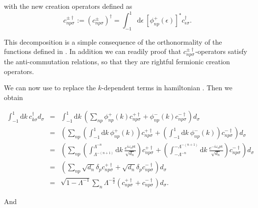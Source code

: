 with the new creation operators defined as 
\[
c_{np\sigma}^{\pm\dagger}:=\left(c_{np\sigma}^{\pm}\right)^{\dagger}=\int_{-1}^{1}\mbox{d}\epsilon\ \left[\phi_{np}^{+}(\epsilon)\right]^{*}c_{\epsilon\sigma}^{\dagger}.
\]


This decomposition 
is a simple consequence of the orthonormality of the functions defined
in . In addition we can readily
proof that $c_{np\sigma}^{\pm\dagger}$-operators satisfy the anti-commutation
relations, so that they are rightful fermionic creation operators. 

We can now use  to replace
the $k$-dependent terms in hamiltonian .
Then we obtain

\begin{eqnarray}
\int_{-1}^{1}\mbox{d}k\ c_{k\sigma}^{\dagger}d_{\sigma} & = & \int_{-1}^{1}\mbox{d}k\ \left(\sum_{np}\phi_{np}^{+}(k)c_{np\sigma}^{+\dagger}+\phi_{np}^{-}(k)c_{np\sigma}^{-\dagger}\right)d_{\sigma}\nonumber \\
 & = & \left(\sum_{np}\left(\int_{-1}^{1}\mbox{d}k\ \phi_{np}^{+}(k)\right)c_{np\sigma}^{+\dagger}+\left(\int_{-1}^{1}\mbox{d}k\ \phi_{np}^{-}(k)\right)c_{np\sigma}^{-\dagger}\right)d_{\sigma}\nonumber \\
 & = & \left(\sum_{np}\left(\int_{\Lambda^{-(n+1)}}^{\Lambda^{-n}}\mbox{d}k\ \frac{e^{i\omega_{n}pk}}{\sqrt{d_{n}}}\right)c_{np\sigma}^{+\dagger}+\left(\int_{-\Lambda^{-n}}^{-\Lambda^{-(n+1)}}\mbox{d}k\ \frac{e^{-i\omega_{n}pk}}{\sqrt{d_{n}}}\right)c_{np\sigma}^{-\dagger}\right)d_{\sigma}\nonumber \\
 & = & \left(\sum_{np}\sqrt{d_{n}}\delta_{p}c_{np\sigma}^{+\dagger}+\sqrt{d_{n}}\delta_{p}c_{np\sigma}^{-\dagger}\right)d_{\sigma}\nonumber \\
 & = & \sqrt{1-\Lambda^{-1}}\sum_{n}\Lambda^{-\frac{n}{2}}\left(c_{np\sigma}^{+\dagger}+c_{np\sigma}^{-\dagger}\right)d_{\sigma}.\label{eq:firt-Integral}
\end{eqnarray}


And 

